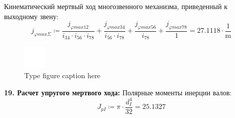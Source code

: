 \documentclass{article}
\newcommand{\defeq}{\coloneq} %
\begin{document}
\colorbox[HTML]{000000}{Кинематический мертвый ход многозвенного механизма, приведенный к выходному звену:}\newline
\begin{equation*}
j_{φmaxΣ} \defeq \frac{\textit{j}_{\textit{φmax12}}}{\textit{i}_{\textit{34}} \cdot \textit{i}_{\textit{56}} \cdot \textit{i}_{\textit{78}}}+\frac{\textit{j}_{\textit{φmax34}}}{\textit{i}_{\textit{56}} \cdot \textit{i}_{\textit{78}}}+\frac{\textit{j}_{\textit{φmax56}}}{\textit{i}_{\textit{78}}}+\frac{\textit{j}_{\textit{φmax78}}}{1} = {27.1118 \cdot \frac{1}{\mathrm{m}}}
\end{equation*}
\begin{figure}[h!]
 \begin{center}
  \includegraphics[max width=\textwidth]{calculations/891.png}
  \caption{Type figure caption here}
  \label{fig:891}
 \end{center}
\end{figure}
\colorbox[HTML]{000000}{\textbf{19. Расчет упругого мертвого хода:}}\newline
\colorbox[HTML]{000000}{Полярные моменты инерции валов:}\newline
\begin{equation*}
J_{pI} \defeq {\pi} \cdot \frac{d_{I}^{4}}{32} = {25.1327}
\end{equation*}
\end{document}
